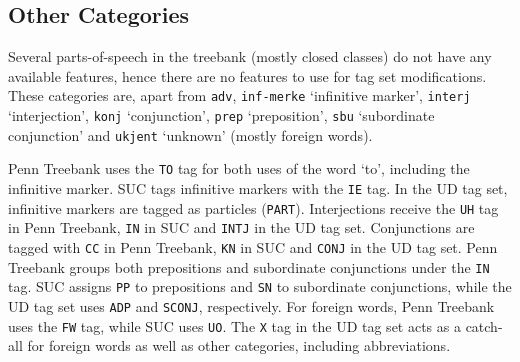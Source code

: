 \documentclass[a4paper,12pt,english]{book}
\begin{document}
\subsection{Other Categories}
\label{ssec:othercat}
Several parts-of-speech in the treebank (mostly closed classes) do not have any
available features, hence there are no features to use for tag set
modifications. These categories are, apart from \texttt{adv},
\texttt{inf-merke} `infinitive marker', \texttt{interj} `interjection',
\texttt{konj} `conjunction', \texttt{prep} `preposition', \texttt{sbu}
`subordinate conjunction' and \texttt{ukjent} `unknown' (mostly foreign words).

Penn Treebank uses the \texttt{TO} tag for both uses of the word `to',
including the infinitive marker. SUC tags infinitive markers with the
\texttt{IE} tag. In the UD tag set, infinitive markers are tagged as particles
(\texttt{PART}).  Interjections receive the \texttt{UH} tag in Penn Treebank,
\texttt{IN} in SUC and \texttt{INTJ} in the UD tag set.  Conjunctions are
tagged with \texttt{CC} in Penn Treebank, \texttt{KN} in SUC and \texttt{CONJ}
in the UD tag set.  Penn Treebank groups both prepositions and subordinate
conjunctions under the \texttt{IN} tag. SUC assigns \texttt{PP} to prepositions
and \texttt{SN} to subordinate conjunctions, while the UD tag set uses
\texttt{ADP} and \texttt{SCONJ}, respectively.  For foreign words, Penn
Treebank uses the \texttt{FW} tag, while SUC uses \texttt{UO}. The \texttt{X}
tag in the UD tag set acts as a catch-all for foreign words as well as other
categories, including abbreviations.




\end{document}
